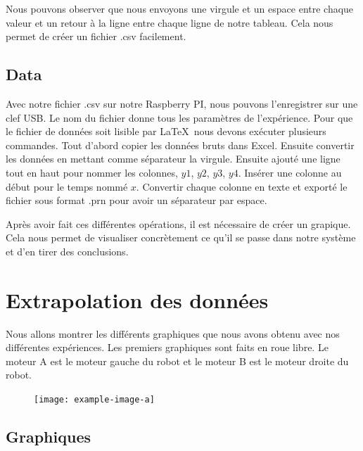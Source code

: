 \documentclass[
	a4paper,									%
	11pt,										%
	twoside,									%
	openright,									%
	notitlepage,									%
	parskip=half,								%
]{scrreprt}										%
\begin{document}
Nous pouvons observer que nous envoyons une virgule et un espace entre chaque valeur et un retour à la ligne entre chaque ligne de notre tableau. 
Cela nous permet de créer un fichier .csv facilement. \par

\section{Data}

Avec notre fichier .csv sur notre Raspberry PI, nous pouvons l'enregistrer sur une clef USB. Le nom du fichier donne tous les paramètres 
de l'expérience. Pour que le fichier de données soit lisible par \LaTeX\ nous devons exécuter plusieurs commandes. 
Tout d'abord copier les données bruts dans Excel. Ensuite convertir les données en mettant comme séparateur la 
virgule. Ensuite ajouté une ligne tout en haut pour nommer les colonnes, $y1$, $y2$, $y3$, $y4$. 
Insérer une colonne au début pour le temps nommé $x$. Convertir chaque colonne en texte et exporté le fichier sous 
format .prn pour avoir un séparateur par espace.  \par

Après avoir fait ces différentes opérations, il est nécessaire de créer un grapique. Cela nous permet de visualiser concrètement ce qu'il 
se passe dans notre système et d'en tirer des conclusions. \par

\chapter{Extrapolation des données}

Nous allons montrer les différents graphiques que nous avons obtenu avec nos différentes expériences. Les premiers 
graphiques sont faits en roue libre. Le moteur A est le moteur gauche du robot et le moteur B est le moteur droite 
du robot. \par

\begin{figure}[!ht]
	\centering
	\texttt{[image: example-image-a]}
	\vspace{.5cm}
	\label{img:img2}
\end{figure}


\section{Graphiques}
\end{document}
